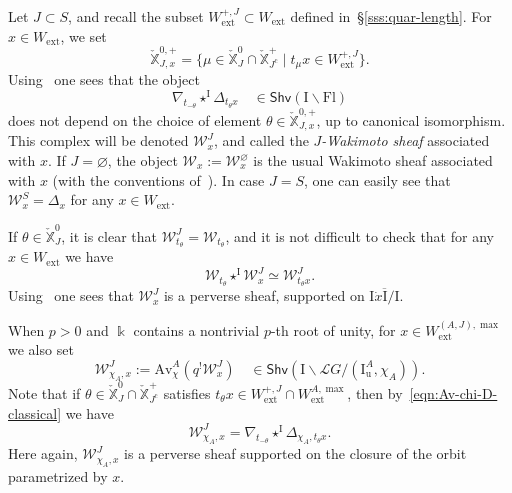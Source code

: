 \documentclass[11pt]{amsart}
\numberwithin{equation}{section}
\theoremstyle{plain}
\theoremstyle{definition}
\newcommand{\I}{{\mathrm I}}
\renewcommand{\k}{\Bbbk}
\newcommand{\sL}{{\mathcal L}}
\newcommand{\sW}{{\mathcal W}}
\newcommand{\X}{{\mathbb X}}
\newcommand{\Xd}{\check{\X}}
\newcommand{\Av}{\mathrm{Av}}
\newcommand{\ex}{\mathrm{ext}}
\newcommand{\Shv}{\mathsf{Shv}}
\newcommand{\Fl}{\mathrm{Fl}}
\newcommand{\Iu}{\mathrm{I}_{\mathrm{u}}}
\newcommand{\comp}{\mathrm{c}}
\begin{document}
Let $J \subset S$, and
recall the subset $W_\ex^{+,J} \subset W_\ex$ defined in~\S\ref{sss:quar-length}. For $x\in W_\ex$, 
we set
\[
\Xd_{J,x}^{0,+} = \{ \mu\in \Xd_J^0\cap \Xd_{J^{\comp}}^+ \mid t_\mu x\in W_\ex^{+,J} \}.
\]
Using~\cite[Lemma~4.1]{adr} one sees that the object
\[
\nabla_{t_{-\theta}} \star^\I \Delta_{t_\theta x} \quad \in \Shv(\I\backslash \Fl)
\]
does not depend on the choice of element $\theta \in \Xd_{J,x}^{0,+}$, up to canonical isomorphism. This complex will be denoted $\sW^J_x$, and called the \textit{$J$-Wakimoto sheaf} associated with $x$. If $J=\varnothing$, the object $\sW_x := \sW^{\varnothing}_x$ is the usual Wakimoto sheaf associated with $x$ (with the conventions of~\cite{adr}). In case $J=S$, one can easily see that $\sW_x^S = \Delta_x$ for any $x \in W_\ex$. 

If $\theta \in \Xd_J^0$, it is clear that $\sW^J_{t_\theta} = \sW_{t_\theta}$, and it is not difficult to check that for any $x \in W_\ex$ we have
\begin{equation}
\label{eqn:convolution-Waki}
\sW_{t_\theta} \star^\I \sW^J_x \simeq \sW^J_{t_\theta x}.
\end{equation}
Using~\cite[Lemma~4.1(3)]{adr} one sees that $\sW^J_x$ is a perverse sheaf, supported on $\overline{\I \dot{x} \I/\I}$.

When $p>0$ and $\k$ contains a nontrivial $p$-th root of unity, for $x\in W_\ex^{(A,J),\max}$ we also set
\begin{equation*}
\sW^J_{\chi_A,x}:= \Av^A_{\chi}(q^! \sW^J_x) \quad \in \Shv(\I \backslash \sL G / (\Iu^A, \chi_A)).
\end{equation*}
Note that if $\theta \in \Xd_J^0 \cap \Xd_{J^\comp}^+$ satisfies $t_\theta x \in W_\ex^{+,J} \cap W_\ex^{A,\max}$, then by~\eqref{eqn:Av-chi-D-classical} we have
\[
\sW^J_{\chi_A,x} = \nabla_{t_{-\theta}} \star^\I \Delta_{\chi_A,t_\theta x}.
\]
Here again, $\sW^J_{\chi_A,x}$ is a perverse sheaf supported on the closure of the orbit parame\-trized by $x$.
\end{document}
